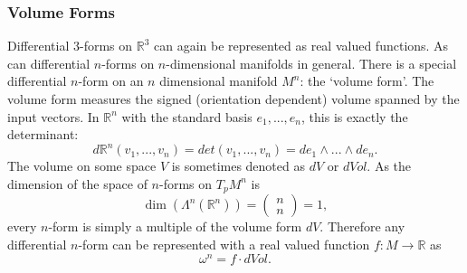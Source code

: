 \subsubsection*{Volume Forms}
Differential $3$-forms on $\mathbb R^3$ can again be represented as real valued functions. As can differential $n$-forms on $n$-dimensional manifolds in general.
There is a special differential $n$-form on an $n$ dimensional manifold $M^n$: the `volume form'. The volume form measures the signed (orientation dependent) volume spanned by the input vectors. In $\mathbb R^n$ with the standard basis $e_1,...,e_n$, this is exactly the determinant:
\[d\mathbb R^n (v_1,..., v_n) = det(v_1,...,v_n) = de_1\wedge ...\wedge d e_n.\]
The volume on some space $V$ is sometimes denoted as $dV$ or $dVol$.
 As the dimension of the space of $n$-forms on $T_pM^n$ is
\[\dim(\Lambda^n(\mathbb R^n)) = \begin{pmatrix}
	n\\n
\end{pmatrix}= 1,\]
every $n$-form is simply a multiple of the volume form $dV$. Therefore any differential $n$-form can be represented with a real valued function $f:M \rightarrow \mathbb R$ as
\[\omega^n = f \cdot dVol.\]


